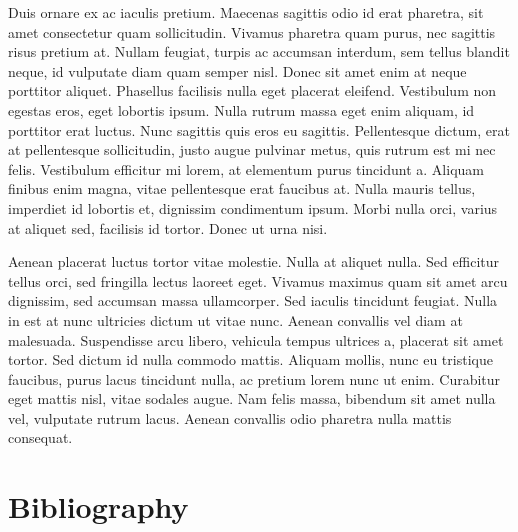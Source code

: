 \documentclass[
  a4paper,
  DIV=11,
  numbers=noendperiod]{scrreprt}
\begin{document}
Duis ornare ex ac iaculis pretium. Maecenas sagittis odio id erat
pharetra, sit amet consectetur quam sollicitudin. Vivamus pharetra quam
purus, nec sagittis risus pretium at. Nullam feugiat, turpis ac accumsan
interdum, sem tellus blandit neque, id vulputate diam quam semper nisl.
Donec sit amet enim at neque porttitor aliquet. Phasellus facilisis
nulla eget placerat eleifend. Vestibulum non egestas eros, eget lobortis
ipsum. Nulla rutrum massa eget enim aliquam, id porttitor erat luctus.
Nunc sagittis quis eros eu sagittis. Pellentesque dictum, erat at
pellentesque sollicitudin, justo augue pulvinar metus, quis rutrum est
mi nec felis. Vestibulum efficitur mi lorem, at elementum purus
tincidunt a. Aliquam finibus enim magna, vitae pellentesque erat
faucibus at. Nulla mauris tellus, imperdiet id lobortis et, dignissim
condimentum ipsum. Morbi nulla orci, varius at aliquet sed, facilisis id
tortor. Donec ut urna nisi.

Aenean placerat luctus tortor vitae molestie. Nulla at aliquet nulla.
Sed efficitur tellus orci, sed fringilla lectus laoreet eget. Vivamus
maximus quam sit amet arcu dignissim, sed accumsan massa ullamcorper.
Sed iaculis tincidunt feugiat. Nulla in est at nunc ultricies dictum ut
vitae nunc. Aenean convallis vel diam at malesuada. Suspendisse arcu
libero, vehicula tempus ultrices a, placerat sit amet tortor. Sed dictum
id nulla commodo mattis. Aliquam mollis, nunc eu tristique faucibus,
purus lacus tincidunt nulla, ac pretium lorem nunc ut enim. Curabitur
eget mattis nisl, vitae sodales augue. Nam felis massa, bibendum sit
amet nulla vel, vulputate rutrum lacus. Aenean convallis odio pharetra
nulla mattis consequat.


\chapter*{Bibliography}\label{bibliography}


\printbibliography[heading=none]


\nocite{*}
\end{document}
